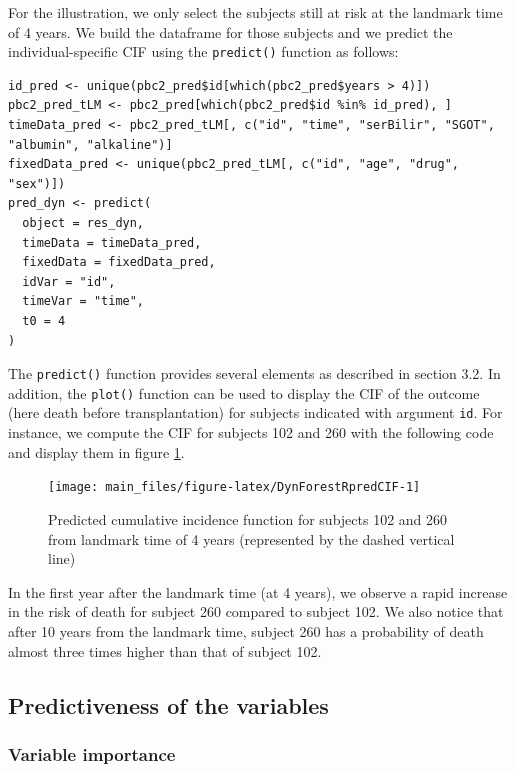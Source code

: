 For the illustration, we only select the subjects still at risk at the landmark time of 4 years. We build the dataframe for those subjects and we predict the individual-specific CIF using the \texttt{predict()} function as follows:

\begin{verbatim}
id_pred <- unique(pbc2_pred$id[which(pbc2_pred$years > 4)])
pbc2_pred_tLM <- pbc2_pred[which(pbc2_pred$id %in% id_pred), ]
timeData_pred <- pbc2_pred_tLM[, c("id", "time", "serBilir", "SGOT", "albumin", "alkaline")]
fixedData_pred <- unique(pbc2_pred_tLM[, c("id", "age", "drug", "sex")])
pred_dyn <- predict(
  object = res_dyn,
  timeData = timeData_pred,
  fixedData = fixedData_pred,
  idVar = "id",
  timeVar = "time",
  t0 = 4
)
\end{verbatim}

The \texttt{predict()} function provides several elements as described in section 3.2. In addition, the \texttt{plot()} function can be used to display the CIF of the outcome (here death before transplantation) for subjects indicated with argument \texttt{id}. For instance, we compute the CIF for subjects 102 and 260 with the following code and display them in figure \ref{fig:DynForestRpredCIF}.

\begin{figure}

{\centering \texttt{[image: main\_files/figure-latex/DynForestRpredCIF-1]} 

}

\caption{Predicted cumulative incidence function for subjects 102 and 260 from landmark time of 4 years (represented by the dashed vertical line)}\label{fig:DynForestRpredCIF}
\end{figure}

In the first year after the landmark time (at 4 years), we observe a rapid increase in the risk of death for subject 260 compared to subject 102. We also notice that after 10 years from the landmark time, subject 260 has a probability of death almost three times higher than that of subject 102.

\subsection{Predictiveness of the variables}\label{predictiveness-of-the-variables}

\subsubsection{Variable importance}\label{variable-importance-1}

